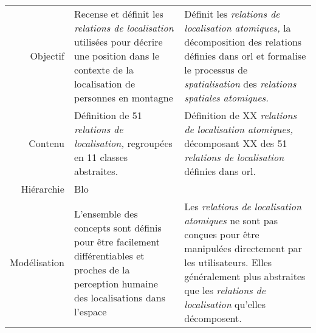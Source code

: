 \begin{tabular}{r>{\small}p{}>{\small}p{}}
  \toprule & \multicolumn{1}{c}{\ac{orl}} &
  \multicolumn{1}{c}{\ac{orla}} \\ \midrule
  \addlinespace
  Objectif & Recense et définit les \emph{relations de localisation} utilisées
  pour décrire une position dans le contexte de la localisation de
  personnes en montagne & Définit les \emph{relations de localisation
                          atomiques,} la décomposition des relations
  définies dans \ac{orl} et formalise le processus de
                          \emph{spatialisation} des \emph{relations
                          spatiales atomiques.}\\
  Contenu & Définition de 51 \emph{relations de localisation,}
            regroupées en 11 classes abstraites. & Définition de XX
                                                   \emph{relations de
                                                   localisation
                                                   atomiques,}
                                                   décomposant XX des
                                                   51 \emph{relations
                                                   de localisation}
                                                   définies dans \ac{orl}.\\
  Hiérarchie & Blo & \\
  Modélisation & L'ensemble des concepts sont définis pour être facilement
       différentiables et proches de la perception humaine des
       localisations dans l'espace & Les \emph{relations de
                                     localisation atomiques} ne sont
                                     pas conçues pour être manipulées
                                     directement par les utilisateurs.
  Elles généralement plus abstraites que les \emph{relations de
                                     localisation} qu'elles
                                     décomposent.\\ 
  \bottomrule
\end{tabular}
